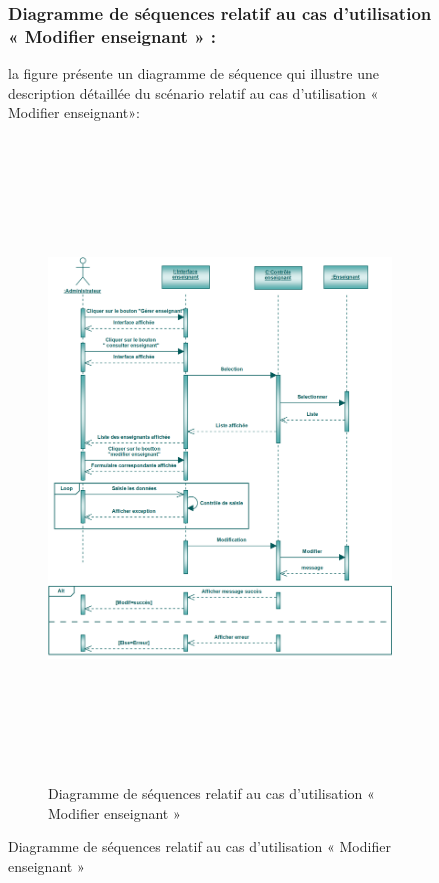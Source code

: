 \documentclass[12 pt]{report}
\begin{document}
\begin{figure}[h]
\begin{center}
\subsubsection{Diagramme de séquences relatif au cas d’utilisation « Modifier enseignant » :}
la figure   présente un diagramme de séquence qui illustre une description détaillée du scénario relatif au cas d’utilisation «  Modifier enseignant»: 
{\begin{figure}[h]
 \begin{center}
\includegraphics[width= 18 cm ,height= 17cm]{sec_modif_ens.PNG}
\caption{Diagramme de séquences relatif au cas d’utilisation « Modifier enseignant »}

\end{center}
\end{figure}}
\newpage

\end{center}
\end{figure}
\end{document}
